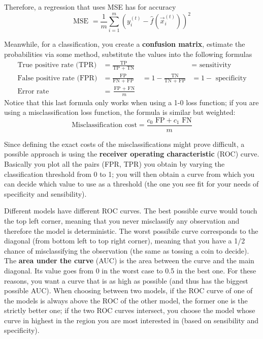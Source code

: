     Therefore, a regression that uses MSE has for accuracy
    $$\text{MSE } = \frac{1}{m} \sum_{i = 1}^{m}\left(y_i^{(t)} - 
                    \hat{f}\left(\vec{x}_i^{(t)}\right)\right)^2$$
    
    Meanwhile, for a classification, you create a \textbf{confusion matrix}, estimate the probabilities via some method, substitute the values into the following formulas
    \begin{align*}
      \text{True positive rate (TPR)} &= \frac{\text{TP}}{\text{TP } + \text{ TN}} &
        &= \text{ sensitivity} \\
      \text{False positive rate (FPR)} &= \frac{\text{FP}}{\text{FN } + \text{ FP}} 
        &= 1 - \frac{\text{TN}}{\text{TN } + \text{ FP}} &= 1 - \text{ specificity} \\
      \text{Error rate} &= \frac{\text{FP } + \text{ FN}}{m}
    \end{align*}
    Notice that this last formula only works when using a 1-0 loss function; if you are using a misclassification loss function, the formula is similar but weighted:
    $$\text{Misclassification cost}= \frac{c_0 \text{ FP} + c_1 \text{ FN}}{m}$$

    Since defining the exact costs of the misclassifications might prove difficult, a possible approach is using the \textbf{receiver operating characteristic} (ROC) curve. Basically you plot all the pairs (FPR, TPR) you obtain by varying the classification threshold from 0 to 1;
    you will then obtain a curve from which you can decide which value to use as a threshold (the one you see fit for your needs of specificity and sensibility). 
   

    Different models have different ROC curves.
    The best possible curve would touch the top left corner, meaning that you never misclassify any observation and therefore the model is deterministic.
    The worst possibile curve corresponds to the diagonal (from bottom left to top right corner), meaning that you have a 1/2 chance of misclassifying the observation (the same as tossing a coin to decide).
    The \textbf{area under the curve} (AUC) is the area between the curve and the main diagonal. Its value goes from 0 in the worst case to 0.5 in the best one. 
    For these reasons, you want a curve that is as high as possible (and thus has the biggest possible AUC). 
    When choosing between two models, if the ROC curve of one of the models is always above the ROC of the other model, the former one is the strictly better one; if the two ROC curves intersect, you choose the model whose curve in highest in the region you are most interested in (based on sensibility and specificity).    
  
